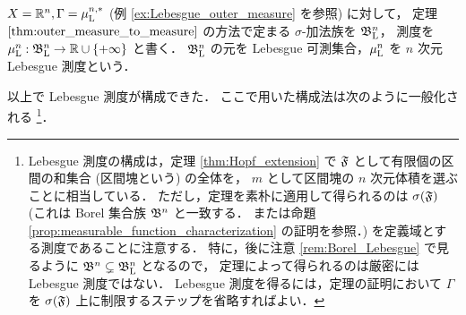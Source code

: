 \begin{example}
    $X=\mathbb{R}^n,\Gamma=\mu_{\mathrm{L}}^{n,\ast}$ (例 \ref{ex:Lebesgue_outer_measure} を参照) に対して，
    定理 $\ref{thm:outer_measure_to_measure}$ の方法で定まる $\sigma$-加法族を $\mathfrak{B}_{\mathrm{L}}^n$，
    測度を $\mu_{\mathrm{L}}^n:\mathfrak{B}_{\mathrm{L}}^n\to\mathbb{R}\cup\{+\infty\}$ と書く．
    $\mathfrak{B}_{\mathrm{L}}^n$ の元を Lebesgue 可測集合，$\mu_{\mathrm{L}}^n$ を $n$ 次元 Lebesgue 測度という．
\end{example}

以上で Lebesgue 測度が構成できた．
ここで用いた構成法は次のように一般化される
\footnote{
    Lebesgue 測度の構成は，定理 \ref{thm:Hopf_extension} で $\mathfrak{F}$ として有限個の区間の和集合 (区間塊という) の全体を，
    $m$ として区間塊の $n$ 次元体積を選ぶことに相当している．
    ただし，定理を素朴に適用して得られるのは $\sigma(\mathfrak{F})$
    (これは Borel 集合族 $\mathfrak{B}^n$ と一致する．
    \cite[定理 6.4]{It63} または命題 \ref{prop:measurable_function_characterization} の証明を参照．)
    を定義域とする測度であることに注意する．
    特に，後に注意 \ref{rem:Borel_Lebesgue} で見るように $\mathfrak{B}^n\subsetneq\mathfrak{B}_{\mathrm{L}}^n$ となるので，
    定理によって得られるのは厳密には Lebesgue 測度ではない．
    Lebesgue 測度を得るには，定理の証明において $\Gamma$ を $\sigma(\mathfrak{F})$ 上に制限するステップを省略すればよい．
}．

